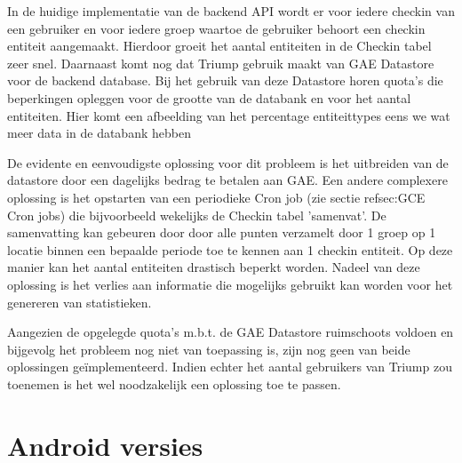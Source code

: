 In de huidige implementatie van de backend API wordt er voor iedere checkin van een gebruiker en voor iedere groep waartoe de gebruiker behoort een checkin entiteit aangemaakt. Hierdoor groeit het aantal entiteiten in de Checkin tabel zeer snel. Daarnaast komt nog dat Triump gebruik maakt van GAE Datastore voor de backend database. Bij het gebruik van deze Datastore horen quota's die beperkingen opleggen voor de grootte van de databank en voor het aantal entiteiten. 
\newline\newline
\HRule 
\newline
Hier komt een afbeelding van het percentage entiteittypes eens we wat meer data in de databank hebben \newline
\HRule
\newline\newline

De evidente en eenvoudigste oplossing voor dit probleem is het uitbreiden van de datastore door een dagelijks bedrag te betalen aan GAE. Een andere complexere oplossing is het opstarten van een periodieke Cron job (zie sectie ref{sec:GCE} Cron jobs) die bijvoorbeeld wekelijks de Checkin tabel 'samenvat'. De samenvatting kan gebeuren door door alle punten verzamelt door 1 groep op 1 locatie binnen een bepaalde periode toe te kennen aan 1 checkin entiteit. Op deze manier kan het aantal entiteiten drastisch beperkt worden. Nadeel van deze oplossing is het verlies aan informatie die mogelijks gebruikt kan worden voor het genereren van statistieken. 

Aangezien de opgelegde quota's m.b.t. de GAE Datastore ruimschoots voldoen en bijgevolg het probleem nog niet van toepassing is, zijn nog geen van beide oplossingen geïmplementeerd.
Indien echter het aantal gebruikers van Triump zou toenemen is het wel noodzakelijk een oplossing toe te passen.

\section{Android versies}

